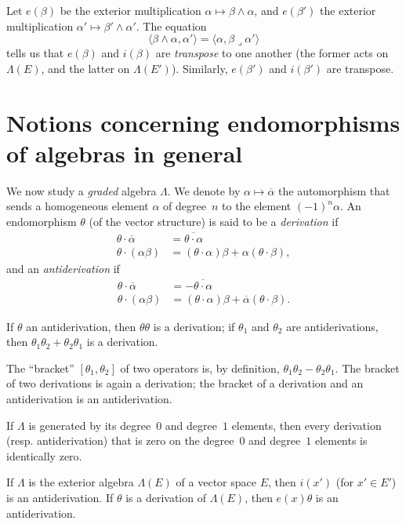 \documentclass{article}
\newcommand{\lrp}{\mathbin{\lrcorner}}
\begin{document}
Let $e(\beta)$ be the exterior multiplication $\alpha\mapsto\beta\wedge\alpha$, and $e(\beta')$ the exterior multiplication $\alpha'\mapsto\beta'\wedge\alpha'$.
The equation
\[
  \langle \beta\wedge\alpha, \alpha' \rangle
  = \langle \alpha, \beta\lrp\alpha' \rangle
\]
tells us that $e(\beta)$ and $i(\beta)$ are \emph{transpose} to one another (the former acts on $\Lambda(E)$, and the latter on $\Lambda(E')$).
Similarly, $e(\beta')$ and $i(\beta')$ are transpose.


\section{Notions concerning endomorphisms of algebras in general}
\label{I.3}

We now study a \emph{graded} algebra $\Lambda$.
We denote by $\alpha\mapsto\overline{\alpha}$ the automorphism that sends a homogeneous element $\alpha$ of degree~$n$ to the element $(-1)^n\alpha$.
An endomorphism $\theta$ (of the vector structure) is said to be a \emph{derivation} if
\[
  \begin{aligned}
    \theta\cdot\overline{\alpha}
    &= \overline{\theta\cdot\alpha}
  \\\theta\cdot(\alpha\beta)
    &= (\theta\cdot\alpha)\beta + \alpha(\theta\cdot\beta),
  \end{aligned}
\]
and an \emph{antiderivation} if
\[
  \begin{aligned}
    \theta\cdot\overline{\alpha}
    &= -\overline{\theta\cdot\alpha}
  \\\theta\cdot(\alpha\beta)
    &= (\theta\cdot\alpha)\beta + \overline{\alpha}(\theta\cdot\beta).
  \end{aligned}
\]

If $\theta$ an antiderivation, then $\theta\theta$ is a derivation;
if $\theta_1$ and $\theta_2$ are antiderivations, then  $\theta_1\theta_2+\theta_2\theta_1$ is a derivation.

The ``bracket'' $[\theta_1,\theta_2]$ of two operators is, by definition, $\theta_1\theta_2-\theta_2\theta_1$.
The bracket of two derivations is again a derivation;
the bracket of a derivation and an antiderivation is an antiderivation.

If $\Lambda$ is generated by its degree~$0$ and degree~$1$ elements, then every derivation (resp. antiderivation) that is zero on the degree~$0$ and degree~$1$ elements is identically zero.

If $\Lambda$ is the exterior algebra $\Lambda(E)$ of a vector space $E$, then $i(x')$ (for $x'\in E'$) is an antiderivation.
If $\theta$ is a derivation of $\Lambda(E)$, then $e(x)\theta$ is an antiderivation.
\end{document}
